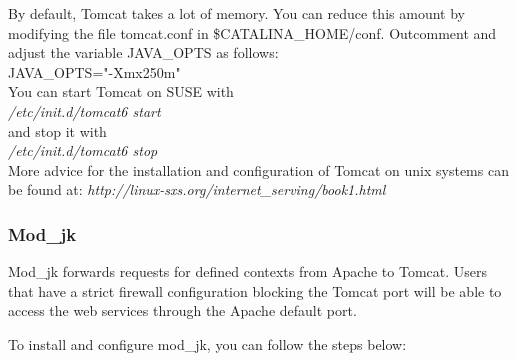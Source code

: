 \documentclass{book}
\begin{document}
By default, Tomcat takes a lot of memory. You can reduce this amount by
modifying the file tomcat.conf in \$CATALINA\_HOME/conf.
Outcomment and adjust the variable JAVA\_OPTS as follows:\\
JAVA\_OPTS="-Xmx250m"\\

You can start Tomcat on SUSE with\\
 \textit{/etc/init.d/tomcat6 start}\\
and stop it with\\
 \textit{/etc/init.d/tomcat6 stop}\\

More advice for the installation and configuration of Tomcat on unix systems
can be found at: \textit{http://linux-sxs.org/internet\_serving/book1.html}

\subsubsection{Mod\_jk}
Mod\_jk forwards requests for defined contexts from Apache to Tomcat.
Users that have a strict firewall configuration blocking the Tomcat port
will be able to access the web services through the Apache default port.

To install and configure mod\_jk, you can follow the steps below:
\end{document}
